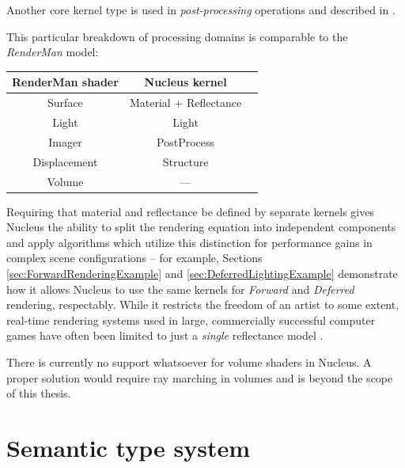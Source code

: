 Another core kernel type is used in \emph{post-processing} operations and described in .

This particular breakdown of processing domains is comparable to the \emph{RenderMan} model:

\begin{center}
\begin{tabular}{ | c | c | c | }
\hline
RenderMan shader & Nucleus kernel \\
\hline
Surface & Material + Reflectance \\
Light & Light \\
Imager & PostProcess \\
Displacement & Structure \\
Volume & --- \\
\hline
\end{tabular}
\end{center}

Requiring that material and reflectance be defined by separate kernels gives Nucleus the ability to split the rendering equation into independent components and apply algorithms which utilize this distinction for performance gains in complex scene configurations -- for example, Sections \ref{sec:ForwardRenderingExample} and \ref{sec:DeferredLightingExample} demonstrate how it allows Nucleus to use the same kernels for \emph{Forward} and \emph{Deferred} rendering, respectably. While it restricts the freedom of an artist to some extent, real-time rendering systems used in large, commercially successful computer games have often been limited to just a \emph{single} reflectance model \cite{CryEngine3Deferred, Killzone2Deferred}.

There is currently no support whatsoever for volume shaders in Nucleus. A proper solution would require ray marching in volumes and is beyond the scope of this thesis.

\section{Semantic type system}

